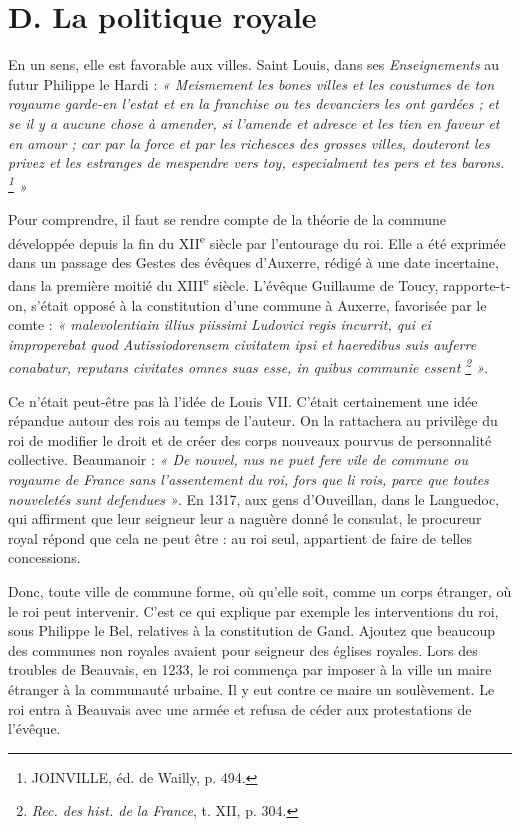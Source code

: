 \documentclass[french,twoside]{book} %
\begin{document}
\section[D. La politique royale]{D. La politique royale}
\label{c08d}
\noindent En un sens, elle est favorable aux villes. Saint Louis, dans ses \emph{Enseignements} au futur Philippe le Hardi : \emph{« Meismement les bones villes et les coustumes de ton royaume garde-en l’estat et en la franchise ou tes devanciers les ont gardées ; et se il y a aucune chose à amender, si l’amende et adresce et les tien en faveur et en amour ; car par la force et par les richesces des grosses villes, douteront les privez et les estranges de mespendre vers toy, especialment tes pers et tes barons. \footnote{JOINVILLE, éd. de Wailly, p. 494.} »}\par
\label{p79} Pour comprendre, il faut se rendre compte de la théorie de la commune développée depuis la fin du XII\textsuperscript{e} siècle par l’entourage du roi. Elle a été exprimée dans un passage des Gestes des évêques d’Auxerre, rédigé à une date incertaine, dans la première moitié du XIII\textsuperscript{e} siècle. L’évêque Guillaume de Toucy, rapporte-t-on, s’était opposé à la constitution d’une commune à Auxerre, favorisée par le comte : \emph{« malevolentiain illius piissimi Ludovici regis incurrit, qui ei improperebat quod Autissiodorensem civitatem ipsi et haeredibus suis auferre conabatur, reputans civitates omnes suas esse, in quibus communie essent \footnote{{\itshape Rec. des hist. de la France}, t. XII, p. 304.} »}.\par
Ce n’était peut-être pas là l’idée de Louis VII. C’était certainement une idée répandue autour des rois au temps de l’auteur. On la rattachera au privilège du roi de modifier le droit et de créer des corps nouveaux pourvus de personnalité collective. Beaumanoir : \emph{« De nouvel, nus ne puet fere vile de commune ou royaume de France sans l’assentement du roi, fors que li rois, parce que toutes nouveletés sunt defendues »}. En 1317, aux gens d’Ouveillan, dans le Languedoc, qui affirment que leur seigneur leur a naguère donné le consulat, le procureur royal répond que cela ne peut être : au roi seul, appartient de faire de telles concessions.\par
Donc, toute ville de commune forme, où qu’elle soit, comme un corps étranger, où le roi peut intervenir. C’est ce qui explique par exemple les interventions du roi, sous Philippe le Bel, relatives à la constitution de Gand. Ajoutez que beaucoup des communes non royales avaient pour seigneur des églises royales. Lors des troubles de Beauvais, en 1233, le roi commença par imposer à la ville un maire étranger à la communauté urbaine. Il y eut contre ce maire un soulèvement. Le roi entra à Beauvais avec une armée et refusa de céder aux protestations de l’évêque.\par
\end{document}
